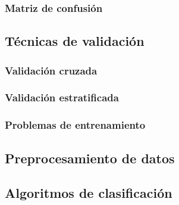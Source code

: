 \subsubsection{Matriz de confusión}
\label{subsubsec:matrix}



\subsection{Técnicas de validación}
\label{subsec:validacion}



\subsubsection{Validación cruzada}
\label{subsubsec:cv}



\subsubsection{Validación estratificada}
\label{subsubsec:ev}



\subsubsection{Problemas de entrenamiento}
\label{subsubsec:overunderfit}

\subsection{Preprocesamiento de datos}



\subsubsection{}




\subsection{Algoritmos de clasificación}



\subsubsection{}



